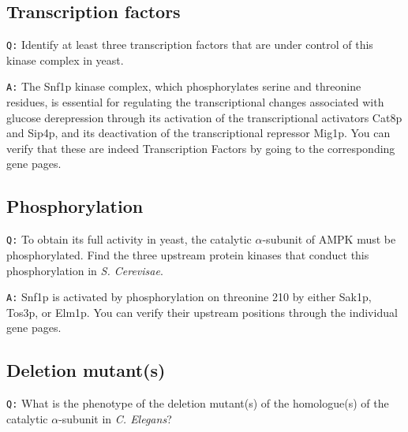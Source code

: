 \documentclass[11pt, a4paper,titlepage]{article}
\begin{document}
\subsection*{Transcription factors}

\texttt{Q:} Identify at least three transcription factors that are
under control of this kinase complex in yeast.
\smallskip

\noindent\texttt{A:} The Snf1p kinase complex, which phosphorylates
serine and threonine residues, is essential for regulating the
transcriptional changes associated with glucose derepression through
its activation of the transcriptional activators Cat8p and Sip4p, and
its deactivation of the transcriptional repressor Mig1p. You can
verify that these are indeed Transcription Factors by going to the
corresponding gene pages.

\subsection*{Phosphorylation}

\texttt{Q:} To obtain its full activity in yeast, the catalytic
$\alpha$-subunit of AMPK must be phosphorylated. Find the three upstream
protein kinases that conduct this phosphorylation in \emph{S. Cerevisae}.

\noindent\texttt{A:} Snf1p is activated by phosphorylation on
threonine 210 by either Sak1p, Tos3p, or Elm1p. You can verify their
upstream positions through the individual gene pages.

\subsection*{Deletion mutant(s)}

\texttt{Q:} What is the phenotype of the deletion mutant(s) of the
homologue(s) of the catalytic $\alpha$-subunit in \emph{C. Elegans}?
\smallskip
\end{document}
